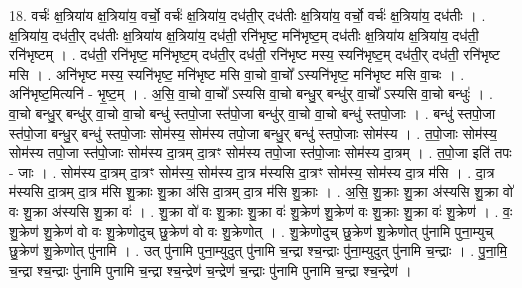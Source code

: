 \documentclass[17pt]{extarticle}
\begin{document}
18. वर्चः॑ क्ष॒त्रिया॑य क्ष॒त्रिया॑य॒ वर्चो॒ वर्चः॑ क्ष॒त्रिया॑य॒ दध॑ती॒र् दध॑तीः क्ष॒त्रिया॑य॒ वर्चो॒ वर्चः॑ क्ष॒त्रिया॑य॒ दध॑तीः । . क्ष॒त्रिया॑य॒ दध॑ती॒र् दध॑तीः क्ष॒त्रिया॑य क्ष॒त्रिया॑य॒ दध॑ती॒ रनि॑भृष्ट॒ मनि॑भृष्ट॒म् दध॑तीः क्ष॒त्रिया॑य क्ष॒त्रिया॑य॒ दध॑ती॒ रनि॑भृष्टम् । . दध॑ती॒ रनि॑भृष्ट॒ मनि॑भृष्ट॒म् दध॑ती॒र् दध॑ती॒ रनि॑भृष्ट मस्य॒ स्यनि॑भृष्ट॒म् दध॑ती॒र् दध॑ती॒ रनि॑भृष्ट मसि । . अनि॑भृष्ट मस्य॒ स्यनि॑भृष्ट॒ मनि॑भृष्ट मसि वा॒चो वा॒चो᳚ ऽस्यनि॑भृष्ट॒ मनि॑भृष्ट मसि वा॒चः । . अनि॑भृष्ट॒मित्यनि॑ - भृ॒ष्ट॒म् । . अ॒सि॒ वा॒चो वा॒चो᳚ ऽस्यसि वा॒चो बन्धु॒र् बन्धु॑र् वा॒चो᳚ ऽस्यसि वा॒चो बन्धुः॑ । . वा॒चो बन्धु॒र् बन्धु॑र् वा॒चो वा॒चो बन्धु॑ स्तपो॒जा स्त॑पो॒जा बन्धु॑र् वा॒चो वा॒चो बन्धु॑ स्तपो॒जाः । . बन्धु॑ स्तपो॒जा स्त॑पो॒जा बन्धु॒र् बन्धु॑ स्तपो॒जाः सोम॑स्य॒ सोम॑स्य तपो॒जा बन्धु॒र् बन्धु॑ स्तपो॒जाः सोम॑स्य । . त॒पो॒जाः सोम॑स्य॒ सोम॑स्य तपो॒जा स्त॑पो॒जाः सोम॑स्य दा॒त्रम् दा॒त्रꣳ सोम॑स्य तपो॒जा स्त॑पो॒जाः सोम॑स्य दा॒त्रम् । . त॒पो॒जा इति॑ तपः - जाः । . सोम॑स्य दा॒त्रम् दा॒त्रꣳ सोम॑स्य॒ सोम॑स्य दा॒त्र म॑स्यसि दा॒त्रꣳ सोम॑स्य॒ सोम॑स्य दा॒त्र म॑सि । . दा॒त्र म॑स्यसि दा॒त्रम् दा॒त्र म॑सि शु॒क्राः शु॒क्रा अ॑सि दा॒त्रम् दा॒त्र म॑सि शु॒क्राः । . अ॒सि॒ शु॒क्राः शु॒क्रा अ॑स्यसि शु॒क्रा वो॑ वः शु॒क्रा अ॑स्यसि शु॒क्रा वः॑ । . शु॒क्रा वो॑ वः शु॒क्राः शु॒क्रा वः॑ शु॒क्रेण॑ शु॒क्रेण॑ वः शु॒क्राः शु॒क्रा वः॑ शु॒क्रेण॑ । . वः॒ शु॒क्रेण॑ शु॒क्रेण॑ वो वः शु॒क्रेणोदुच् छु॒क्रेण॑ वो वः शु॒क्रेणोत् । . शु॒क्रेणोदुच् छु॒क्रेण॑ शु॒क्रेणोत् पु॑नामि पुना॒म्युच् छु॒क्रेण॑ शु॒क्रेणोत् पु॑नामि । . उत् पु॑नामि पुना॒म्युदुत् पु॑नामि च॒न्द्रा श्च॒न्द्राः पु॑ना॒म्युदुत् पु॑नामि च॒न्द्राः । . पु॒ना॒मि॒ च॒न्द्रा श्च॒न्द्राः पु॑नामि पुनामि च॒न्द्रा श्च॒न्द्रेण॑ च॒न्द्रेण॑ च॒न्द्राः पु॑नामि पुनामि च॒न्द्रा श्च॒न्द्रेण॑ । \newline
\end{document}
